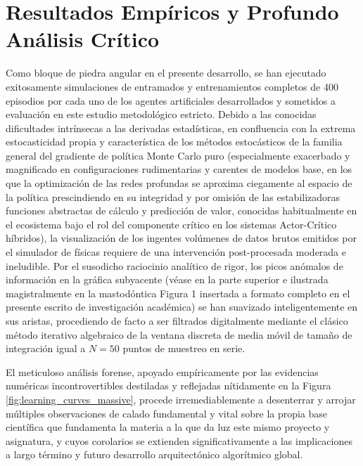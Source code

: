 \documentclass[a4paper,12pt,twocolumn]{article}
\begin{document}
\section{Resultados Empíricos y Profundo Análisis Crítico}
Como bloque de piedra angular en el presente desarrollo, se han ejecutado exitosamente simulaciones de entramados y entrenamientos completos de 400 episodios por cada uno de los agentes artificiales desarrollados y sometidos a evaluación en este estudio metodológico estricto. Debido a las conocidas dificultades intrínsecas a las derivadas estadísticas, en confluencia con la extrema estocasticidad propia y característica de los métodos estocásticos de la familia general del gradiente de política Monte Carlo puro (especialmente exacerbado y magnificado en configuraciones rudimentarias y carentes de modelos base, en los que la optimización de las redes profundas se aproxima ciegamente al espacio de la política prescindiendo en su integridad y por omisión de las estabilizadoras funciones abstractas de cálculo y predicción de valor, conocidas habitualmente en el ecosistema bajo el rol del componente crítico en los sistemas Actor-Crítico híbridos), la visualización de los ingentes volúmenes de datos brutos emitidos por el simulador de físicas requiere de una intervención post-procesada moderada e ineludible. Por el susodicho raciocinio analítico de rigor, los picos anómalos de información en la gráfica subyacente (véase en la parte superior e ilustrada magistralmente en la mastodóntica Figura 1 insertada a formato completo en el presente escrito de investigación académica) se han suavizado inteligentemente en sus aristas, procediendo de facto a ser filtrados digitalmente mediante el clásico método iterativo algebraico de la ventana discreta de media móvil de tamaño de integración igual a $N=50$ puntos de muestreo en serie.

El meticuloso análisis forense, apoyado empíricamente por las evidencias numéricas incontrovertibles destiladas y reflejadas nítidamente en la Figura \ref{fig:learning_curves_massive}, procede irremediablemente a desenterrar y arrojar múltiples observaciones de calado fundamental y vital sobre la propia base científica que fundamenta la materia a la que da luz este mismo proyecto y asignatura, y cuyos corolarios se extienden significativamente a las implicaciones a largo término y futuro desarrollo arquitectónico algorítmico global.
\end{document}
